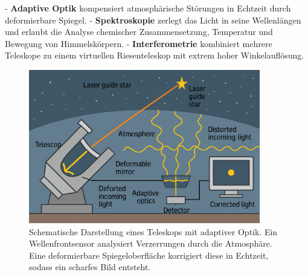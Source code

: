 - \textbf{Adaptive Optik} kompensiert atmosphärische Störungen in Echtzeit durch deformierbare Spiegel.
- \textbf{Spektroskopie} zerlegt das Licht in seine Wellenlängen und erlaubt die Analyse chemischer Zusammensetzung, Temperatur und Bewegung von Himmelskörpern.
- \textbf{Interferometrie} kombiniert mehrere Teleskope zu einem virtuellen Riesenteleskop mit extrem hoher Winkelauflösung.
\begin{figure}[H]
	\centering
	\includegraphics[width=0.9\textwidth]{bilder/Teleskop.png}
	\caption{Schematische Darstellung eines Teleskops mit adaptiver Optik. Ein Wellenfrontsensor analysiert Verzerrungen durch die Atmosphäre. Eine deformierbare Spiegeloberfläche korrigiert diese in Echtzeit, sodass ein scharfes Bild entsteht.}
	\label{fig:adaptive_optik}
\end{figure}

